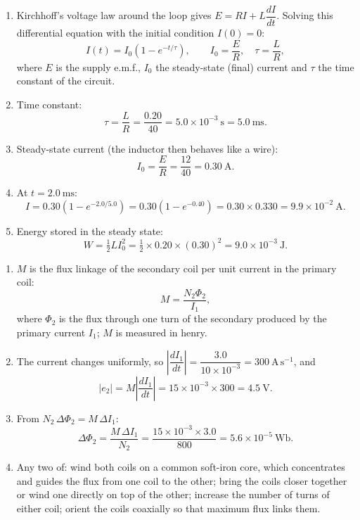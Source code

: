 \documentclass[11pt]{article}
\begin{document}
\begin{corrige}
\begin{enumerate}
\item Kirchhoff's voltage law around the loop gives $E = RI + L\dfrac{dI}{dt}$. Solving this differential equation with the initial condition $I(0) = 0$:
\[ I(t) = I_0\left(1 - e^{-t/\tau}\right), \qquad I_0 = \frac{E}{R},\quad \tau = \frac{L}{R}, \]
where $E$ is the supply e.m.f., $I_0$ the steady-state (final) current and $\tau$ the time constant of the circuit.
\item Time constant:
\[ \tau = \frac{L}{R} = \frac{0.20}{40} = 5.0\times10^{-3}\ \mathrm{s} = 5.0\ \mathrm{ms}. \]
\item Steady-state current (the inductor then behaves like a wire):
\[ I_0 = \frac{E}{R} = \frac{12}{40} = 0.30\ \mathrm{A}. \]
\item At $t = 2.0\ \mathrm{ms}$:
\[ I = 0.30\left(1 - e^{-2.0/5.0}\right) = 0.30\left(1 - e^{-0.40}\right) = 0.30 \times 0.330 = 9.9\times10^{-2}\ \mathrm{A}. \]
\item Energy stored in the steady state:
\[ W = \tfrac{1}{2}LI_0^2 = \tfrac{1}{2}\times 0.20 \times (0.30)^2 = 9.0\times10^{-3}\ \mathrm{J}. \]
\end{enumerate}
\end{corrige}

\begin{corrige}
\begin{enumerate}
\item $M$ is the flux linkage of the secondary coil per unit current in the primary coil:
\[ M = \frac{N_2\Phi_2}{I_1}, \]
where $\Phi_2$ is the flux through one turn of the secondary produced by the primary current $I_1$; $M$ is measured in henry.
\item The current changes uniformly, so $\left|\dfrac{dI_1}{dt}\right| = \dfrac{3.0}{10\times10^{-3}} = 300\ \mathrm{A\,s^{-1}}$, and
\[ |e_2| = M\left|\frac{dI_1}{dt}\right| = 15\times10^{-3} \times 300 = 4.5\ \mathrm{V}. \]
\item From $N_2\,\Delta\Phi_2 = M\,\Delta I_1$:
\[ \Delta\Phi_2 = \frac{M\,\Delta I_1}{N_2} = \frac{15\times10^{-3}\times 3.0}{800} = 5.6\times10^{-5}\ \mathrm{Wb}. \]
\item Any two of: wind both coils on a common soft-iron core, which concentrates and guides the flux from one coil to the other; bring the coils closer together or wind one directly on top of the other; increase the number of turns of either coil; orient the coils coaxially so that maximum flux links them.
\end{enumerate}
\end{corrige}
\end{document}

